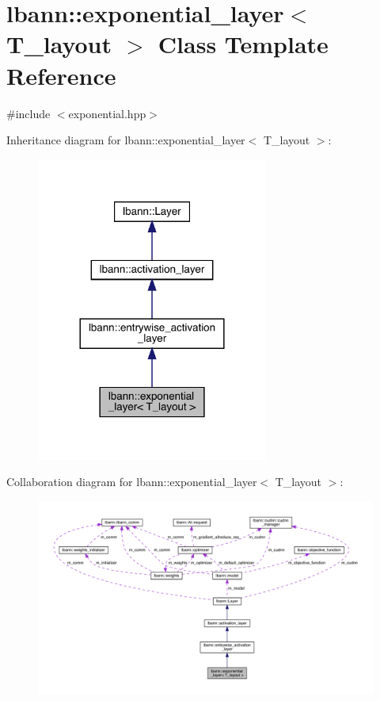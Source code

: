 \hypertarget{classlbann_1_1exponential__layer}{}\section{lbann\+:\+:exponential\+\_\+layer$<$ T\+\_\+layout $>$ Class Template Reference}
\label{classlbann_1_1exponential__layer}


{\ttfamily \#include $<$exponential.\+hpp$>$}



Inheritance diagram for lbann\+:\+:exponential\+\_\+layer$<$ T\+\_\+layout $>$\+:\nopagebreak
\begin{figure}[H]
\begin{center}
\leavevmode
\includegraphics[width=216pt]{classlbann_1_1exponential__layer__inherit__graph}
\end{center}
\end{figure}


Collaboration diagram for lbann\+:\+:exponential\+\_\+layer$<$ T\+\_\+layout $>$\+:\nopagebreak
\begin{figure}[H]
\begin{center}
\leavevmode
\includegraphics[width=350pt]{classlbann_1_1exponential__layer__coll__graph}
\end{center}
\end{figure}
